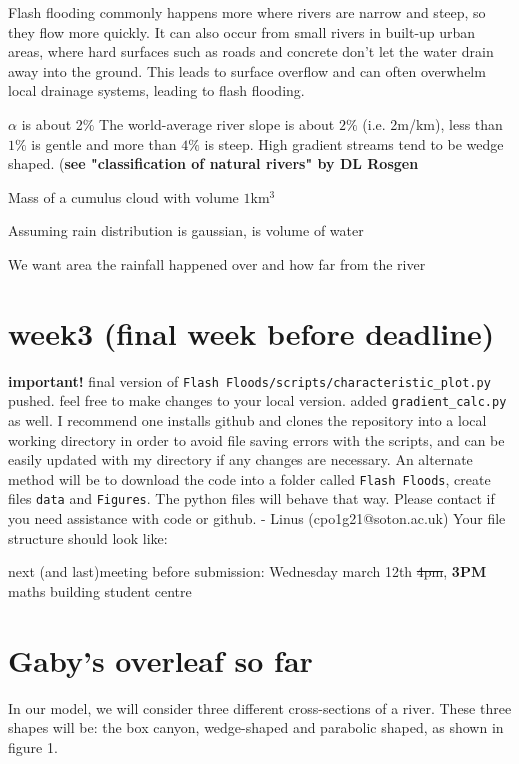 \documentclass[12pt]{article}
\begin{document}
Flash flooding commonly happens more where rivers are narrow and steep, so they flow more quickly. It can also occur from small rivers in built-up urban areas, where hard surfaces such as roads and concrete don't let the water drain away into the ground. This leads to surface overflow and can often overwhelm local drainage systems, leading to flash flooding.

$\alpha$ is about 2$\%$
The world-average river slope is about $2\%$ (i.e. 2m/km), less than $1\%$ is gentle and more than $4\%$ is steep.
High gradient streams tend to be wedge shaped. (\textbf{see "classification of natural rivers" by DL Rosgen}


Mass of a cumulus cloud with volume $1$km$^3$

Assuming rain distribution is gaussian, is volume of water

We want area the rainfall happened over and how far from the river
\section{week3 (final week before deadline)}
\textbf{important!} 
final version of \verb|Flash Floods/scripts/characteristic_plot.py| pushed. feel free to make changes to your local version. added \verb|gradient_calc.py| as well.
I recommend one installs github and clones the repository into a local working directory in order to avoid file saving errors with the scripts, and can be easily updated with my directory if any changes are necessary. An
alternate method will be to download the code into a folder called \verb|Flash Floods|, create files \verb|data| and \verb|Figures|. The python files will behave that way. Please contact if you need assistance with code or github. - Linus (cpo1g21@soton.ac.uk)
Your file structure should look like:

next (and last)meeting before submission: Wednesday march 12th \st{4pm}, \textbf{3PM} maths building student centre

\section{Gaby's overleaf so far}
In our model, we will consider three different cross-sections of a river.  These three shapes will be: the box canyon, wedge-shaped and parabolic shaped, as shown in figure 1.
\end{document}
